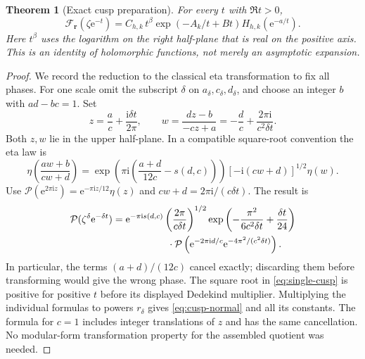 \documentclass[11pt,a4paper]{article}
\numberwithin{equation}{section}
\newtheorem{theorem}{Theorem}[section]
\theoremstyle{definition}\newtheorem{definition}[theorem]{Definition}
\theoremstyle{remark}\newtheorem{remark}[theorem]{Remark}
\newcommand{\ii}{\mathrm i}\newcommand{\e}{\mathrm e}
\newcommand{\Poch}{\mathcal P}\newcommand{\F}{\mathcal F}
\newcommand{\vct}[1]{\boldsymbol{#1}}
\begin{document}
\begin{theorem}[Exact cusp preparation]\label{thm:cusp}
For every $t$ with $\Re t>0$,
\begin{equation}\label{eq:cusp-normal}
 \boxed{\quad
 \F_{\vct r}(\zeta\e^{-t})
 =C_{h,k}\,t^\beta\exp(-A_k/t+Bt)
           H_{h,k}(\e^{-a/t}).\quad}
\end{equation}
Here $t^\beta$ uses the logarithm on the right half-plane that is real
on the positive axis. This is an identity of holomorphic functions, not
merely an asymptotic expansion.
\end{theorem}
\begin{proof}
We record the reduction to the classical eta transformation
\cite[\S27.14]{dlmf} to fix all phases. For one scale omit the subscript
$\delta$ on $a_\delta,c_\delta,d_\delta$, and choose an integer $b$ with
$ad-bc=1$. Set
\[
 z=\frac ac+\frac{\ii\delta t}{2\pi},\qquad
 w=\frac{dz-b}{-cz+a}=-\frac dc+\frac{2\pi\ii}{c^2\delta t}.
\]
Both $z,w$ lie in the upper half-plane. In a compatible square-root
convention the eta law is
\[
 \eta\left(\frac{aw+b}{cw+d}\right)
 =\exp\!\left(\pi\ii\left(\frac{a+d}{12c}-s(d,c)\right)\right)
 [-\ii(cw+d)]^{1/2}\eta(w).
\]
Use $\Poch(\e^{2\pi\ii z})=\e^{-\pi\ii z/12}\eta(z)$ and
$cw+d=2\pi\ii/(c\delta t)$. The result is
\begin{align}
 \Poch(\zeta^\delta\e^{-\delta t})
 ={}&\e^{-\pi\ii s(d,c)}
 \left(\frac{2\pi}{c\delta t}\right)^{1/2}
 \exp\left(-\frac{\pi^2}{6c^2\delta t}+\frac{\delta t}{24}\right)
 \notag\\
 &\hspace{15mm}\cdot
 \Poch\left(\e^{-2\pi\ii d/c}
                   \e^{-4\pi^2/(c^2\delta t)}\right).
 \label{eq:single-cusp}
\end{align}
In particular, the terms $(a+d)/(12c)$ cancel exactly; discarding them
before transforming would give the wrong phase. The square root in
\eqref{eq:single-cusp} is positive for positive $t$ before its displayed
Dedekind multiplier. Multiplying the individual formulas to powers
$r_\delta$ gives \eqref{eq:cusp-normal} and all its constants. The
formula for $c=1$ includes integer translations of $z$ and has the same
cancellation. No modular-form transformation property for the assembled
quotient was needed.
\end{proof}
\end{document}
